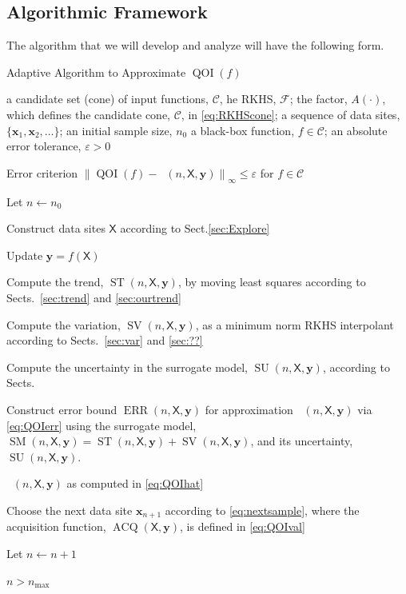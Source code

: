 \documentclass[11pt]{NSFamsart}
\DeclareMathOperator{\QOI}{QOI} %
\DeclareMathOperator{\APP}{\widehat{\QOI}}
\DeclareMathOperator{\SURR}{SM} %
\DeclareMathOperator{\STREND}{ST} %
\DeclareMathOperator{\SVAR}{SV} %
\DeclareMathOperator{\ERR}{ERR}
\DeclareMathOperator{\VAL}{ACQ}
\DeclareMathOperator{\SURRERR}{SU}
\newcommand{\mX}{\mathsf{X}}
\newcommand{\bx}{{\boldsymbol{x}}}
\newcommand{\by}{{\boldsymbol{y}}}
\newcommand{\cc}{\mathcal{C}}
\newcommand{\calf}{{\mathcal{F}}}
\newcommand{\bignorm}[2][{}]{\ensuremath{\bigl \lVert #2 \bigr \rVert}_{#1}}
\begin{document}
\subsection{Algorithmic Framework}
The algorithm that we will develop and analyze will have the following form.

\begin{algorithm}[H]
	\caption*{Adaptive Algorithm to Approximate $\QOI(f)$ \label{alg:algframe}}
	\begin{algorithmic}
		\PARAM a candidate set (cone) of input functions, $\cc$, he RKHS, $\calf$; the factor, $A(\cdot)$, which defines  the candidate cone, $\cc$, in \eqref{eq:RKHScone};  a sequence of data sites, $\{\bx_1, \bx_2, \ldots \}$; an initial sample size, $n_0$
		\INPUT a black-box function, $f \in \cc$; an absolute error tolerance, $\varepsilon>0$
		
		\Ensure Error criterion $\bignorm[\infty]{\QOI(f) - \APP(n,\mX,\by)} \le \varepsilon$  for $f \in \cc$
		
		\State Let $n \leftarrow n_0$
		
		\State Construct data sites $\mX$ according to Sect.\ref{sec:Explore}  
		
		\Repeat {}
		
		\State Update $\by = f(\mX)$
		
		\State Compute the  trend, $\STREND(n,\mX,\by)$, by moving least squares according to Sects.\ \ref{sec:trend} and \ref{sec:ourtrend}
		
		\State Compute the variation, $\SVAR(n,\mX,\by)$, as a minimum norm RKHS interpolant according to Sects.\ \ref{sec:var} and \ref{sec:??}
		
		\State Compute the  uncertainty in the surrogate model, $\SURRERR(n,\mX,\by)$, according to Sects.\ 
		
		\State Construct error bound $\ERR(n,\mX,\by)$ for approximation $\APP(n,\mX,\by)$ via \eqref{eq:QOIerr} using the surrogate model, $\SURR(n,\mX,\by) = \STREND(n,\mX,\by) + \SVAR(n,\mX,\by)$, and its uncertainty, $\SURRERR(n,\mX,\by)$.
		
		\If{$\ERR(n,\mX,\by) \le \varepsilon$}
		
		\RETURN $\APP(n,\mX,\by)$ as computed in \eqref{eq:QOIhat}
		
		\EndIf
				
		\State Choose the next data site $\bx_{n+1}$ according to \eqref{eq:nextsample}, where the acquisition function, $\VAL(\mX,\by)$, is defined in \eqref{eq:QOIval}
		
		\State Let $n \leftarrow n + 1$

		\Until $n > n_{\max}$
				
	\end{algorithmic}
\end{algorithm}
\end{document}
